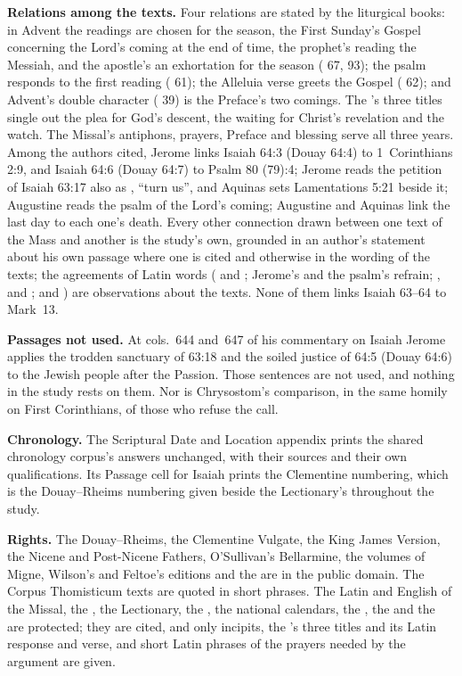 {\textbf{Relations among the texts.} Four relations are stated by the liturgical
books: in Advent the readings are chosen for the season, the First Sunday's
Gospel concerning the Lord's coming at the end of time, the prophet's reading
the Messiah, and the apostle's an exhortation for the season
( 67, 93); the psalm responds to the first reading
( 61); the Alleluia verse greets the Gospel
( 62); and Advent's double character
( 39) is the Preface's two comings. The 's
three titles single out the plea for God's descent, the waiting for Christ's
revelation and the watch. The Missal's antiphons, prayers, Preface and blessing
serve all three years. Among the authors cited, Jerome links Isaiah
64:3 (Douay 64:4) to 1~Corinthians 2:9, and Isaiah 64:6 (Douay 64:7) to Psalm
80 (79):4; Jerome reads the petition of Isaiah 63:17 also as , ``turn us'', and Aquinas sets Lamentations 5:21 beside it; Augustine
reads the psalm of the Lord's coming;
Augustine and Aquinas link the last day to each one's death. Every other
connection drawn between one text of the Mass and another is the study's own,
grounded in an author's statement about his own passage where one is cited
and otherwise in the wording of the texts; the agreements of Latin words
( and ; Jerome's 
and the psalm's refrain; ,
 and ;  and
) are observations about the texts. None of them links Isaiah 63--64
to Mark~13.

\textbf{Passages not used.} At cols.~644 and~647 of his commentary on Isaiah
Jerome applies the trodden sanctuary of 63:18 and the soiled justice of 64:5
(Douay 64:6) to the Jewish people after the Passion. Those sentences are not
used, and nothing in the study rests on them. Nor is Chrysostom's comparison,
in the same homily on First Corinthians, of those who refuse the call.

\textbf{Chronology.} The Scriptural Date and Location appendix prints the
shared chronology corpus's answers unchanged, with their sources and their
own qualifications. Its Passage cell for Isaiah prints the Clementine
numbering, which is the Douay--Rheims numbering given beside the Lectionary's
throughout the study.

\textbf{Rights.} The Douay--Rheims, the Clementine Vulgate, the King James
Version, the Nicene and Post-Nicene Fathers, O'Sullivan's Bellarmine, the
volumes of Migne, Wilson's and Feltoe's editions and the  are in the public domain. The Corpus Thomisticum texts are
quoted in short phrases. The Latin and English of the Missal, the , the Lectionary, the , the national
calendars, the , the  and the
 are protected; they are cited, and
only incipits, the 's three titles and its Latin response and verse,
and short Latin phrases of the prayers needed by the argument are given.

}
